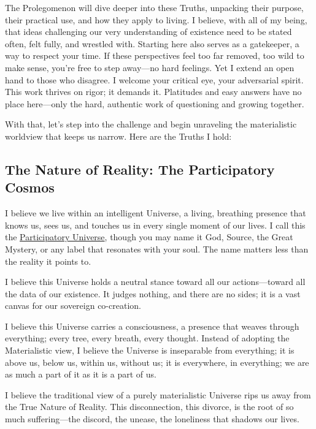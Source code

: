 \documentclass{article}
\begin{document}
The Prolegomenon will dive deeper into these Truths, unpacking their purpose, their practical use, and how they apply to living. I believe, with all of my being, that ideas challenging our very understanding of existence need to be stated often, felt fully, and wrestled with. Starting here also serves as a gatekeeper, a way to respect your time. If these perspectives feel too far removed, too wild to make sense, you're free to step away—no hard feelings. Yet I extend an open hand to those who disagree. I welcome your critical eye, your adversarial spirit. This work thrives on rigor; it demands it. Platitudes and easy answers have no place here—only the hard, authentic work of questioning and growing together.

With that, let's step into the challenge and begin unraveling the materialistic worldview that keeps us narrow. Here are the Truths I hold:

\subsection*{The Nature of Reality: The Participatory Cosmos}

I believe we live within an intelligent Universe, a living, breathing presence that knows us, sees us, and touches us in every single moment of our lives. I call this the \hyperlink{gloss:participatory_universe}{Participatory Universe}, though you may name it God, Source, the Great Mystery, or any label that resonates with your soul. The name matters less than the reality it points to.

I believe this Universe holds a neutral stance toward all our actions—toward all the data of our existence. It judges nothing, and there are no sides; it is a vast canvas for our sovereign co-creation.

I believe this Universe carries a consciousness, a presence that weaves through everything; every tree, every breath, every thought. Instead of adopting the Materialistic view, I believe the Universe is inseparable from everything; it is above us, below us, within us, without us; it is everywhere, in everything; we are as much a part of it as it is a part of us.

I believe the traditional view of a purely materialistic Universe rips us away from the True Nature of Reality. This disconnection, this divorce, is the root of so much suffering—the discord, the unease, the loneliness that shadows our lives.
\end{document}
